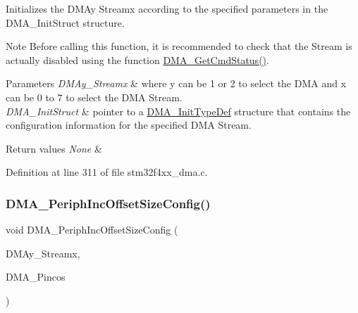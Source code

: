 Initializes the D\+M\+Ay Streamx according to the specified parameters in the D\+M\+A\+\_\+\+Init\+Struct structure. 

\begin{DoxyNote}{Note}
Before calling this function, it is recommended to check that the Stream is actually disabled using the function \hyperlink{group___d_m_a___group4_gaa4d631cdd6cd020106435f30c0c6fb15}{D\+M\+A\+\_\+\+Get\+Cmd\+Status()}. 
\end{DoxyNote}

\begin{DoxyParams}{Parameters}
{\em D\+M\+Ay\+\_\+\+Streamx} & where y can be 1 or 2 to select the D\+MA and x can be 0 to 7 to select the D\+MA Stream. \\
\hline
{\em D\+M\+A\+\_\+\+Init\+Struct} & pointer to a \hyperlink{struct_d_m_a___init_type_def}{D\+M\+A\+\_\+\+Init\+Type\+Def} structure that contains the configuration information for the specified D\+MA Stream. \\
\hline
\end{DoxyParams}

\begin{DoxyRetVals}{Return values}
{\em None} & \\
\hline
\end{DoxyRetVals}


Definition at line 311 of file stm32f4xx\+\_\+dma.\+c.

\mbox{\label{group___d_m_a___group1_ga210a9861460b3c9b3fa14fdc1a949744}} 
\subsubsection{\texorpdfstring{D\+M\+A\+\_\+\+Periph\+Inc\+Offset\+Size\+Config()}{DMA\_PeriphIncOffsetSizeConfig()}}
{\footnotesize\ttfamily void D\+M\+A\+\_\+\+Periph\+Inc\+Offset\+Size\+Config (\begin{DoxyParamCaption}\item[{\hyperlink{struct_d_m_a___stream___type_def}{D\+M\+A\+\_\+\+Stream\+\_\+\+Type\+Def} $\ast$}]{D\+M\+Ay\+\_\+\+Streamx,  }\item[{uint32\+\_\+t}]{D\+M\+A\+\_\+\+Pincos }\end{DoxyParamCaption})}



